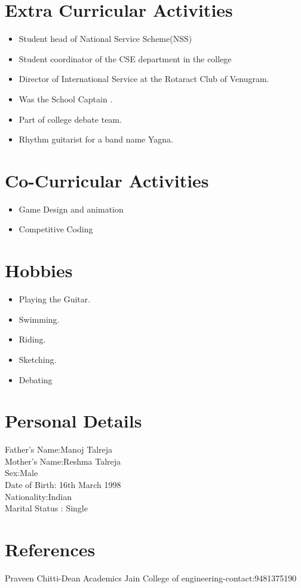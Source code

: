 \documentclass{article}
\begin{document}
		\section{Extra Curricular Activities}
			\begin{itemize}
				\item Student head of National Service Scheme(NSS)
				\item Student coordinator of the CSE department in the college
				\item Director of International Service at the Rotaract Club of Venugram.
				\item Was the School Captain .
				\item Part of college debate team.
				\item Rhythm guitarist for a band name Yagna.
			\end{itemize}
		\section{Co-Curricular Activities}
			\begin{itemize}
				\item Game Design and animation
				\item Competitive Coding 
			\end{itemize}
		\section{Hobbies}
			\begin{itemize}
				\item Playing the Guitar.
				\item Swimming.
				\item Riding.
				\item Sketching.
				\item Debating
			\end{itemize}
			\section{Personal Details}
				Father's Name:Manoj Talreja \\
				Mother's Name:Reshma Talreja\\
				Sex:Male\\
				Date of Birth: 16th March 1998\\ 	
				Nationality:Indian \\
				Marital Status : Single \\
			\section{References}
			Praveen Chitti-Dean Academics Jain College of engineering-contact:9481375190
\end{document}
